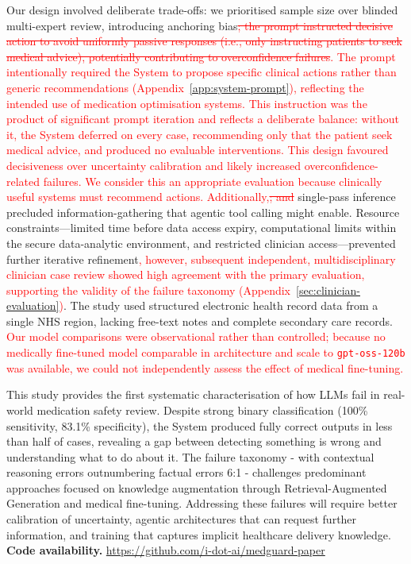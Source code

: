\documentclass[12pt]{article}
\newcommand{\added}[1]{\textcolor{red}{#1}}
\newcommand{\removed}[1]{\textcolor{red}{\sout{#1}}}
\begin{document}
Our design involved deliberate trade-offs: we prioritised sample size over blinded multi-expert review, introducing anchoring bias\removed{; the prompt instructed decisive action to avoid uniformly passive responses (i.e., only instructing patients to seek medical advice), potentially contributing to overconfidence failures}\added{. The prompt intentionally required the System to propose specific clinical actions rather than generic recommendations (Appendix~\ref{app:system-prompt}), reflecting the intended use of medication optimisation systems. This instruction was the product of significant prompt iteration and reflects a deliberate balance: without it, the System deferred on every case, recommending only that the patient seek medical advice, and produced no evaluable interventions. This design favoured decisiveness over uncertainty calibration and likely increased overconfidence-related failures. We consider this an appropriate evaluation because clinically useful systems must recommend actions. Additionally,}\removed{; and} single-pass inference precluded information-gathering that agentic tool calling might enable. Resource constraints—limited time before data access expiry, computational limits within the secure data-analytic environment, and restricted clinician access—prevented further iterative refinement\added{, however, subsequent independent, multidisciplinary clinician case review showed high agreement with the primary evaluation, supporting the validity of the failure taxonomy (Appendix~\ref{sec:clinician-evaluation})}. The study used structured electronic health record data from a single NHS region, lacking free-text notes and complete secondary care records. \added{Our model comparisons were observational rather than controlled; because no medically fine-tuned model comparable in architecture and scale to \texttt{gpt-oss-120b} was available, we could not independently assess the effect of medical fine-tuning.}

This study provides the first systematic characterisation of how LLMs fail in real-world medication safety review. Despite strong binary classification (100\% sensitivity, 83.1\% specificity), the System produced fully correct outputs in less than half of cases, revealing a gap between detecting something is wrong and understanding what to do about it. The failure taxonomy - with contextual reasoning errors outnumbering factual errors 6:1 - challenges predominant approaches focused on knowledge augmentation through Retrieval-Augmented Generation and medical fine-tuning. Addressing these failures will require better calibration of uncertainty, agentic architectures that can request further information, and training that captures implicit healthcare delivery knowledge.
\\[0.75em]
\textbf{Code availability.} \url{https://github.com/i-dot-ai/medguard-paper}
        
\end{document}
